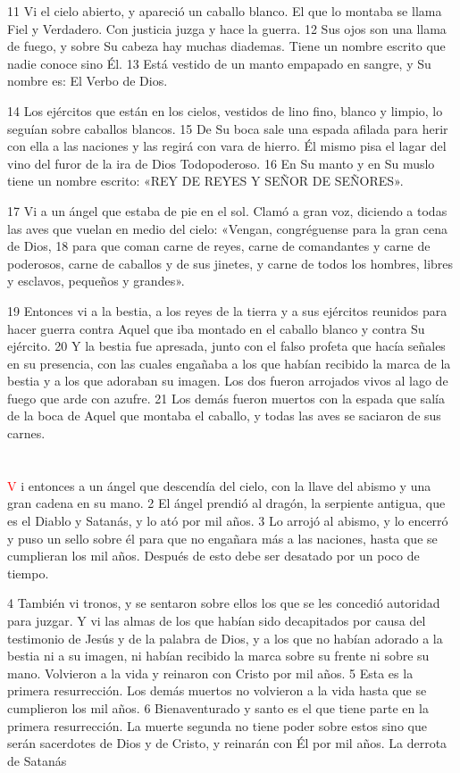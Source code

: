 \documentclass[12pt,twocolumn,twoside]{book}
\begin{document}
11 Vi el cielo abierto, y apareció un caballo blanco. El que lo montaba se llama Fiel y Verdadero. Con justicia juzga y hace la guerra. 12 Sus ojos son una llama de fuego, y sobre Su cabeza hay muchas diademas. Tiene un nombre escrito que nadie conoce sino Él. 13 Está vestido de un manto empapado en sangre, y Su nombre es: El Verbo de Dios.

14 Los ejércitos que están en los cielos, vestidos de lino fino, blanco y limpio, lo seguían sobre caballos blancos. 15 De Su boca sale una espada afilada para herir con ella a las naciones y las regirá con vara de hierro. Él mismo pisa el lagar del vino del furor de la ira de Dios Todopoderoso. 16 En Su manto y en Su muslo tiene un nombre escrito: «REY DE REYES Y SEÑOR DE SEÑORES».

17 Vi a un ángel que estaba de pie en el sol. Clamó a gran voz, diciendo a todas las aves que vuelan en medio del cielo: «Vengan, congréguense para la gran cena de Dios, 18 para que coman carne de reyes, carne de comandantes y carne de poderosos, carne de caballos y de sus jinetes, y carne de todos los hombres, libres y esclavos, pequeños y grandes».

19 Entonces vi a la bestia, a los reyes de la tierra y a sus ejércitos reunidos para hacer guerra contra Aquel que iba montado en el caballo blanco y contra Su ejército. 20 Y la bestia fue apresada, junto con el falso profeta que hacía señales en su presencia, con las cuales engañaba a los que habían recibido la marca de la bestia y a los que adoraban su imagen. Los dos fueron arrojados vivos al lago de fuego que arde con azufre. 21 Los demás fueron muertos con la espada que salía de la boca de Aquel que montaba el caballo, y todas las aves se saciaron de sus carnes.
\chapter{}
\lettrine[lines=4,slope=-.5em]{\textcolor{red}{V}}{ } i entonces a un ángel que descendía del cielo, con la llave del abismo y una gran cadena en su mano. 2 El ángel prendió al dragón, la serpiente antigua, que es el Diablo y Satanás, y lo ató por mil años. 3 Lo arrojó al abismo, y lo encerró y puso un sello sobre él para que no engañara más a las naciones, hasta que se cumplieran los mil años. Después de esto debe ser desatado por un poco de tiempo.

4 También vi tronos, y se sentaron sobre ellos los que se les concedió autoridad para juzgar. Y vi las almas de los que habían sido decapitados por causa del testimonio de Jesús y de la palabra de Dios, y a los que no habían adorado a la bestia ni a su imagen, ni habían recibido la marca sobre su frente ni sobre su mano. Volvieron a la vida y reinaron con Cristo por mil años. 5 Esta es la primera resurrección. Los demás muertos no volvieron a la vida hasta que se cumplieron los mil años. 6 Bienaventurado y santo es el que tiene parte en la primera resurrección. La muerte segunda no tiene poder sobre estos sino que serán sacerdotes de Dios y de Cristo, y reinarán con Él por mil años.
La derrota de Satanás
\end{document}
